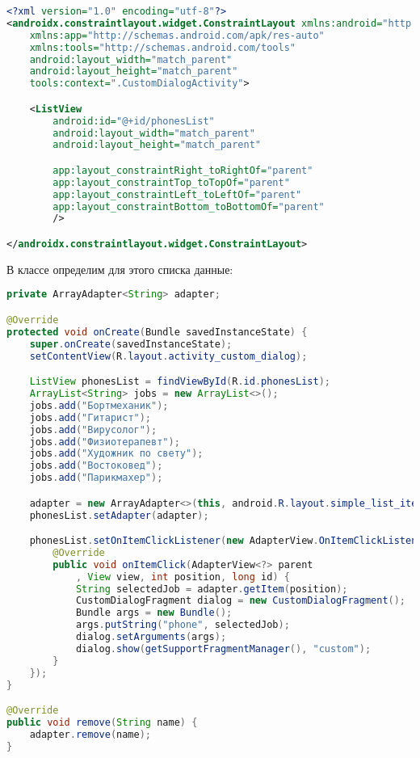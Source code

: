 \begin{lstlisting}[language=XML
	, label=lst:
	]
<?xml version="1.0" encoding="utf-8"?>
<androidx.constraintlayout.widget.ConstraintLayout xmlns:android="http://schemas.android.com/apk/res/android"
    xmlns:app="http://schemas.android.com/apk/res-auto"
    xmlns:tools="http://schemas.android.com/tools"
    android:layout_width="match_parent"
    android:layout_height="match_parent"
    tools:context=".CustomDialogActivity">

    <ListView
        android:id="@+id/phonesList"
        android:layout_width="match_parent"
        android:layout_height="match_parent"

        app:layout_constraintRight_toRightOf="parent"
        app:layout_constraintTop_toTopOf="parent"
        app:layout_constraintLeft_toLeftOf="parent"
        app:layout_constraintBottom_toBottomOf="parent"
        />

</androidx.constraintlayout.widget.ConstraintLayout>
\end{lstlisting}

В классе определим для этого списка данные:

\begin{lstlisting}[language=Java
	, label=lst:
	]
private ArrayAdapter<String> adapter;

@Override
protected void onCreate(Bundle savedInstanceState) {
	super.onCreate(savedInstanceState);
	setContentView(R.layout.activity_custom_dialog);

	ListView phonesList = findViewById(R.id.phonesList);
	ArrayList<String> jobs = new ArrayList<>();
	jobs.add("Бортмеханик");
	jobs.add("Гитарист");
	jobs.add("Вирусолог");
	jobs.add("Физиотерапевт");
	jobs.add("Художник по свету");
	jobs.add("Востоковед");
	jobs.add("Парикмахер");

	adapter = new ArrayAdapter<>(this, android.R.layout.simple_list_item_1, jobs);
	phonesList.setAdapter(adapter);

	phonesList.setOnItemClickListener(new AdapterView.OnItemClickListener() {
		@Override
		public void onItemClick(AdapterView<?> parent
			, View view, int position, long id) {
			String selectedJob = adapter.getItem(position);
			CustomDialogFragment dialog = new CustomDialogFragment();
			Bundle args = new Bundle();
			args.putString("phone", selectedJob);
			dialog.setArguments(args);
			dialog.show(getSupportFragmentManager(), "custom");
		}
	});
}

@Override
public void remove(String name) {
	adapter.remove(name);
}
\end{lstlisting}

